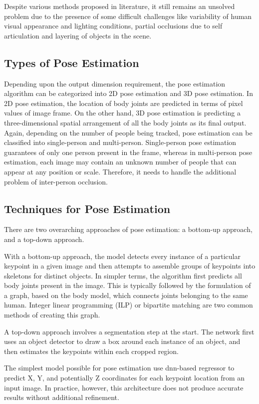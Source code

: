 Despite various methods proposed in literature, it still remains an unsolved  problem due to the presence of some difficult challenges like variability of human visual appearance and lighting conditions, partial occlusions due to self articulation and layering of objects in the scene. 

\subsection{Types of Pose Estimation} 
Depending upon the output dimension requirement, the pose estimation algorithm can be categorized into 2D pose estimation and 3D pose estimation. In 2D pose estimation, the location of body joints are predicted in terms of pixel values of image frame. On the other hand, 3D pose estimation is predicting a three-dimensional spatial arrangement of all the body joints as its final output. Again, depending on the number of people being tracked, pose estimation can be classified into single-person and multi-person. Single-person pose estimation guarantees of only one person present in the frame, whereas in multi-person pose estimation, each image may contain an unknown number of people that can appear at any position or scale. Therefore, it needs to handle the additional problem of inter-person occlusion. 


\subsection{Techniques for Pose Estimation} 
There are two overarching approaches of pose estimation: a bottom-up approach, and a top-down approach.

With a bottom-up approach, the model detects every instance of a particular keypoint in a given image and then attempts to assemble groups of keypoints into skeletons for distinct objects. In simpler terms, the algorithm first predicts all body joints present in the image. This is typically followed by the formulation of a graph, based on the body model, which connects joints belonging to the same human. Integer linear programming (ILP) or bipartite matching are two common methods of creating this graph.

A top-down approach involves a segmentation step at the start. The network first uses an object detector to draw a box around each instance of an object, and then estimates the keypoints within each cropped region. 

The simplest model possible for pose estimation use \gls{dnn}-based regressor to predict X, Y, and potentially Z coordinates for each keypoint location from an input image. In practice, however, this architecture does not produce accurate results without additional refinement. 

